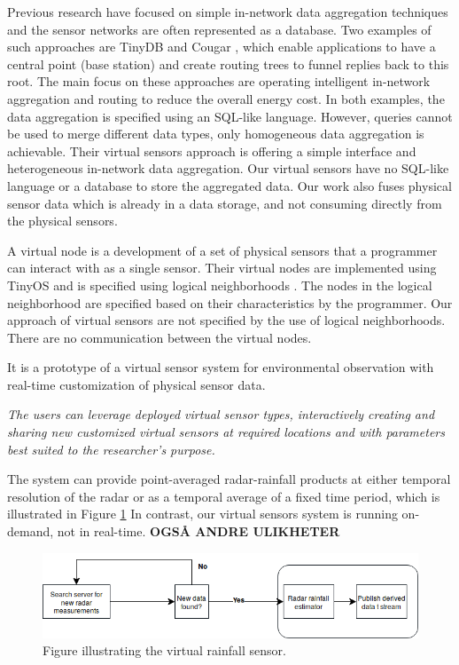 \documentclass[USenglish]{uit-thesis}
\begin{document}
Previous research have focused on simple in-network data aggregation techniques and the sensor networks are often represented as a database. Two examples of such approaches are TinyDB \cite{tinyDB} and Cougar \cite{cougar}, which enable applications to have a central point (base station) and create routing trees  to funnel replies back to this root. The main focus on these approaches are operating intelligent in-network aggregation and routing to reduce  the overall energy cost.
In both examples, the data aggregation is specified using an SQL-like language. However, queries cannot be used to merge different data types, only homogeneous data aggregation is achievable.
Their virtual sensors approach is  offering a simple interface and heterogeneous in-network data aggregation. Our virtual sensors have no SQL-like language or a database to store the aggregated data. Our work also fuses physical sensor data which is already in a data storage, and not consuming directly from the physical sensors.


A virtual node\cite{Ciciriello} is a development of a set of physical sensors that a programmer can interact with as a single sensor. Their virtual nodes are implemented using TinyOS \cite{TinyOS} and is specified using logical neighborhoods \cite{Mottola2006}\cite{Mottola2006_2}. 
The nodes in the logical neighborhood are specified based on their characteristics by the programmer.
Our approach of virtual sensors are not specified by the use of logical neighborhoods. There are no communication between the virtual nodes.


It is a prototype of a virtual sensor system for environmental observation with real-time customization of physical sensor data\cite{hill}. 

\textit{The users can leverage deployed virtual sensor types, interactively creating and sharing new customized virtual sensors at required locations and with parameters best suited to the researcher's purpose.}

The system can provide point-averaged radar-rainfall products at either temporal resolution of the radar or as a temporal average of a fixed time period, which is illustrated in Figure \ref{fig:rainfall_sensor}
In contrast, our virtual sensors system is running on-demand, not in real-time. \textbf{OGSÅ ANDRE ULIKHETER}

\begin{figure}
\centering
\includegraphics[width=\textwidth]{rainfall_sensor.png}
\caption{Figure illustrating the virtual rainfall sensor.}
\label{fig:rainfall_sensor}
\end{figure}
\end{document}
